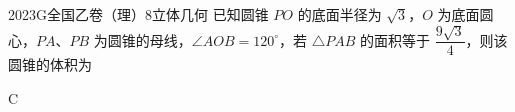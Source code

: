 
\begin{problem}{2023}{G}{全国乙卷（理）}{8}{立体几何}
已知圆锥 $ PO $ 的底面半径为 $ \sqrt{3} $，$ O $ 为底面圆心，$ PA $、$ PB $ 为圆锥的母线，$ \angle AOB = 120^\circ $，若 $ \triangle PAB $ 的面积等于 $ \dfrac{9\sqrt{3}}{4} $，则该圆锥的体积为
\begin{choices}
\choice{{$\pi$}}
\choice{{$3\pi$}}
\end{choices}
\end{problem}

\begin{answer}
C
\end{answer}

\begin{solutions}

\end{solutions}